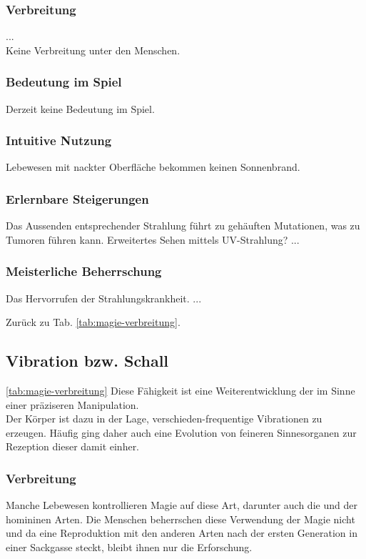 \subsubsection{Verbreitung}
...\\
Keine Verbreitung unter den Menschen.

\subsubsection{Bedeutung im Spiel}
Derzeit keine Bedeutung im Spiel.

\subsubsection{Intuitive Nutzung}
Lebewesen mit nackter Oberfläche bekommen keinen Sonnenbrand.

\subsubsection{Erlernbare Steigerungen}
\begin{outline}
	\1 Das Aussenden entsprechender Strahlung führt zu gehäuften Mutationen, was zu Tumoren führen kann.
	\1 Erweitertes Sehen mittels UV-Strahlung?
	\1 ...
\end{outline}

\subsubsection{Meisterliche Beherrschung} 
\begin{outline}
	\1 Das Hervorrufen der Strahlungskrankheit.
	\1 ...
\end{outline}
Zurück zu Tab. \ref{tab:magie-verbreitung}.



\subsection{Vibration bzw. Schall}\label{sec:vibrationsmagie} \ref{tab:magie-verbreitung}
Diese Fähigkeit ist eine Weiterentwicklung der  im Sinne einer präziseren Manipulation.\\
Der Körper ist dazu in der Lage, verschieden-frequentige Vibrationen zu erzeugen. Häufig ging daher auch eine Evolution von feineren Sinnesorganen zur Rezeption dieser damit einher.

\subsubsection{Verbreitung}
Manche Lebewesen kontrollieren Magie auf diese Art, darunter auch die  und  der homininen Arten. Die Menschen beherrschen diese Verwendung der Magie nicht und da eine Reproduktion mit den anderen Arten nach der ersten Generation in einer Sackgasse steckt, bleibt ihnen nur die Erforschung.


